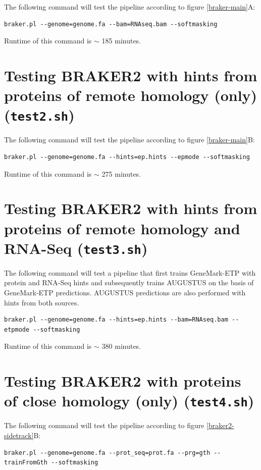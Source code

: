 \documentclass[a4paper,10pt]{report}
\begin{document}
The following command will test the pipeline according to figure \ref{braker-main}A:

\begin{verbatim}
braker.pl --genome=genome.fa --bam=RNAseq.bam --softmasking
\end{verbatim}

Runtime of this command is $\sim$ 185 minutes.

\section{Testing BRAKER2 with hints from proteins of remote homology (only) (\texttt{test2.sh})}

The following command will test the pipeline according to figure \ref{braker-main}B:

\begin{verbatim}
braker.pl --genome=genome.fa --hints=ep.hints --epmode --softmasking
\end{verbatim}

Runtime of this command is $\sim$ 275 minutes.

\section{Testing BRAKER2 with hints from proteins of remote homology and RNA-Seq (\texttt{test3.sh})}

The following command will test a pipeline that first trains GeneMark-ETP with protein and RNA-Seq hints and subsequently trains AUGUSTUS on the basis of GeneMark-ETP predictions. AUGUSTUS predictions are also performed with hints from both sources.

\begin{verbatim}
braker.pl --genome=genome.fa --hints=ep.hints --bam=RNAseq.bam --etpmode --softmasking
\end{verbatim}

Runtime of this command is $\sim$ 380 minutes.

\section{Testing BRAKER2 with proteins of close homology (only) (\texttt{test4.sh})}

The following command will test the pipeline according to figure \ref{braker2-sidetrack}B:

\begin{verbatim}
braker.pl --genome=genome.fa --prot_seq=prot.fa --prg=gth --trainFromGth --softmasking
\end{verbatim}
\end{document}
